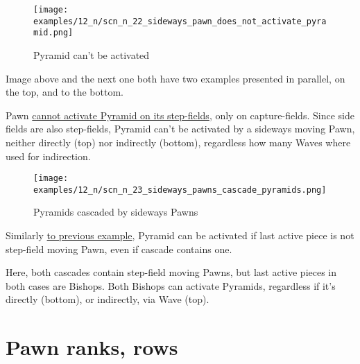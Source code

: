 \vspace*{-1.4\baselineskip}
\noindent
\begin{figure}[!h]
\texttt{[image: examples/12\_n/scn\_n\_22\_sideways\_pawn\_does\_not\_activate\_pyramid.png]}
\vspace*{-1.3\baselineskip}
\caption{Pyramid can't be activated}
\label{fig:scn_n_22_sideways_pawn_does_not_activate_pyramid}
\end{figure}

\vspace*{-0.3\baselineskip}
Image above and the next one both have two examples presented in parallel, on the
top, and to the bottom.

Pawn
\hyperref[fig:scn_mv_38_activating_pyramid_by_pawn]{cannot activate Pyramid on its step-fields},
only on capture-fields.
Since side fields are also step-fields, Pyramid can't be activated by a sideways
moving Pawn, neither directly (top) nor indirectly (bottom), regardless how many
Waves where used for indirection.

\clearpage %

\vspace*{-2.1\baselineskip}
\noindent
\begin{figure}[!h]
\texttt{[image: examples/12\_n/scn\_n\_23\_sideways\_pawns\_cascade\_pyramids.png]}
\caption{Pyramids cascaded by sideways Pawns}
\label{fig:scn_n_23_sideways_pawns_cascade_pyramids}
\end{figure}

Similarly
\hyperref[fig:scn_mv_39_activating_pyramid_cascade_pawn]{to previous example},
Pyramid can be activated if last active piece is not step-field moving Pawn, even
if cascade contains one.

Here, both cascades contain step-field moving Pawns, but last active pieces in both
cases are Bishops. Both Bishops can activate Pyramids, regardless if it's directly
(bottom), or indirectly, via Wave (top).

\clearpage %

\section*{Pawn ranks, rows}
\label{sec:Nineteen/Pawn ranks, rows}

